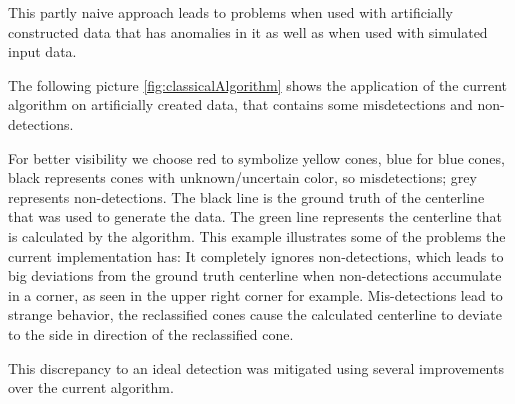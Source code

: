 This partly naive approach leads to problems when used with artificially constructed data that has anomalies in it as well as when used with simulated input data.

The following picture \ref{fig:classicalAlgorithm} shows the application of the current algorithm on artificially created data, that contains some misdetections and non-detections.

For better visibility we choose red to symbolize yellow cones, blue for blue cones, black represents cones with unknown/uncertain color, so misdetections; grey represents non-detections. The black line is the ground truth of the centerline that was used to generate the data. The green line represents the centerline that is calculated by the algorithm. This example illustrates some of the problems the current implementation has: It completely ignores non-detections, which leads to big deviations from the ground truth centerline when non-detections accumulate in a corner, as seen in the upper right corner for example. Mis-detections lead to strange behavior, the reclassified cones cause the calculated centerline to deviate to the side in direction of the reclassified cone.


This discrepancy to an ideal detection was mitigated using several improvements over the current algorithm.

